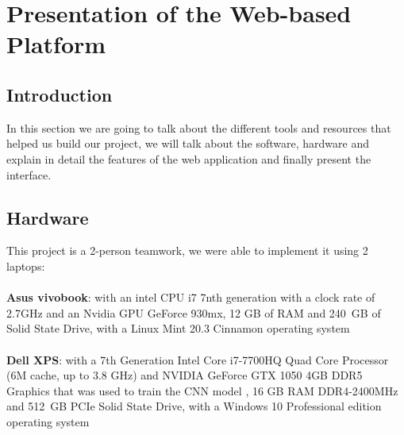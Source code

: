 \section{Presentation of the Web-based Platform}



\subsection{Introduction}
    In this section we are going to talk about the different tools and resources that helped us build our project, we will talk about the software, hardware and explain in detail the features of the web application and finally present the interface.


\subsection{Hardware}
    This project is a 2-person teamwork, we were able to implement it using 2 laptops: \\
    \bigskip \\
    \textbf{Asus vivobook}: with an intel CPU i7 7nth generation with a clock rate of 2.7GHz and an Nvidia GPU GeForce 930mx, 12 GB of RAM and 240 GB of Solid State Drive, with a Linux Mint 20.3 Cinnamon operating system\\ 
    \bigskip \\
    \textbf{Dell XPS}: with a 7th Generation Intel Core i7-7700HQ Quad Core Processor (6M cache, up to 3.8 GHz) and NVIDIA GeForce GTX 1050 4GB DDR5 Graphics that was used to train the CNN model , 16 GB RAM DDR4-2400MHz and 512 GB PCIe Solid State Drive, with a Windows 10 Professional edition operating system \\ 


